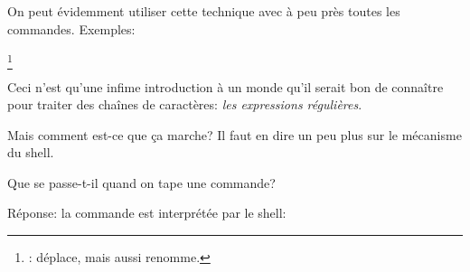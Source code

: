   On peut évidemment utiliser cette technique avec à peu près toutes les
  commandes.
  Exemples:


  \footnote{: déplace, mais aussi renomme.}

  \begin{center}
    \begin{boxedminipage}{0.75\linewidth}
   Ceci n'est qu'une infime introduction à un monde qu'il serait bon de
  connaître pour traiter des chaînes de caractères: \emph{les
    expressions régulières}.
    \end{boxedminipage}
  \end{center}


  Mais comment est-ce que ça marche? Il faut en dire un peu plus sur
  le mécanisme du shell.
  
  Que se passe-t-il quand on tape une commande?
  
  Réponse: la commande est interprétée par le shell:

